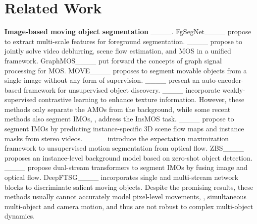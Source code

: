 \section{Related Work}
\label{sec:related}

\noindent\textbf{Image-based moving object segmentation} 
____. 
FgSegNet____ propose to extract multi-scale features for foreground segmentation. 
____ propose to jointly solve video deblurring, scene flow estimation, and MOS in a unified framework. 
GraphMOS____ put forward the concepts of graph signal processing for MOS. 
MOVE____ proposes to segment movable objects from a single image without any form of supervision.
____ present an auto-encoder-based framework for unsupervised object discovery.
____ incorporate weakly-supervised contrastive learning to enhance texture information.
However, these methods only separate the AMOs from the background, while some recent methods also segment IMOs, \ie, address the InsMOS task.
____ propose to segment IMOs by predicting instance-specific 3D scene flow maps and instance masks from stereo videos.
____ introduce the expectation maximization framework to unsupervised motion segmentation from optical flow. 
ZBS____ proposes an instance-level background model based on zero-shot object detection. 
____ propose dual-stream transformers to segment IMOs by fusing image and optical flow. 
DeepFTSG____ incorporates single and multi-stream network blocks to discriminate salient moving objects. 
Despite the promising results, these methods usually cannot accurately model pixel-level movements, \eg, simultaneous multi-object and camera motion, and thus are not robust to complex multi-object dynamics. 


